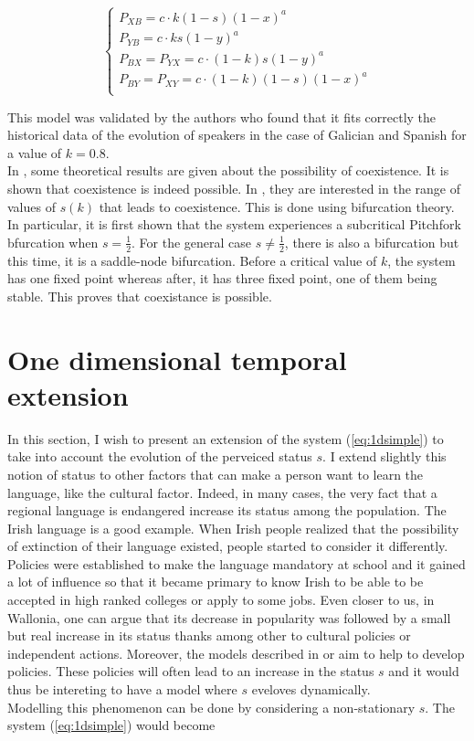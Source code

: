 \documentclass{article}
\begin{document}
\[
\begin{cases}
P_{XB} = c \cdot k (1-s) (1-x)^a \\
P_{YB} = c \cdot k s (1-y)^a \\
P_{BX} = P_{YX} = c \cdot (1-k) s (1-y)^a \\
P_{BY} = P_{XY} = c \cdot (1-k) (1-s) (1-x)^a \\
\end{cases}
\]

This model was validated by the authors who found that it fits correctly the historical data of the evolution of speakers in the case of Galician and Spanish for a value of $k = 0.8$. \\
In \cite{BAGGS19939}, some theoretical results are given about the possibility of coexistence. It is shown that coexistence is indeed possible. In \cite{bilingual}, they are interested in the range of values of $s(k)$ that leads to coexistence. This is done using bifurcation theory. In particular, it is first shown that the system experiences a subcritical Pitchfork bfurcation when $s = \frac{1}{2}$. For the general case $s \ne \frac{1}{2}$, there is also a bifurcation but this time, it is a saddle-node bifurcation. Before a critical value of $k$, the system has one fixed point whereas after, it has three fixed point, one of them being stable. This proves that coexistance is possible.

\section{One dimensional temporal extension}
\label{sec:1d}
In this section, I wish to present an extension of the system (\ref{eq:1dsimple}) to take into account the evolution of the perveiced status $s$.
I extend slightly this notion of status to other factors that can make a person want to learn the language, like the cultural factor.
Indeed, in many cases, the very fact that a regional language is endangered increase its status among the population.
The Irish language is a good example.
When Irish people realized that the possibility of extinction of their language existed, people started to consider it differently.
Policies were established to make the language mandatory at school and it gained a lot of influence so that it became primary to know Irish to be able to be accepted in high ranked colleges or apply to some jobs.
Even closer to us, in Wallonia, one can argue that its decrease in popularity was followed by a small but real increase in its status thanks among other to cultural policies or independent actions.
Moreover, the models described in \cite{death} or \cite{bilingual} aim to help to develop policies.
These policies will often lead to an increase in the status $s$ and it would thus be intereting to have a model where $s$ eveloves dynamically. \\
Modelling this phenomenon can be done by considering a non-stationary $s$. The system (\ref{eq:1dsimple}) would become
\end{document}
